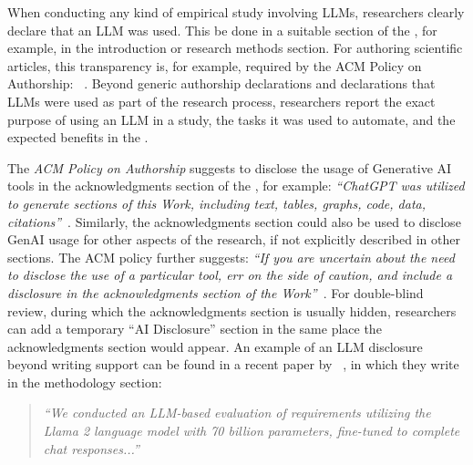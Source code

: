 
When conducting any kind of empirical study involving LLMs, researchers \must clearly declare that an LLM was used.
This \should be done in a suitable section of the \paper, for example, in the introduction or research methods section.
For authoring scientific articles, this transparency is, for example, required by the ACM Policy on Authorship: ~\cite{ACM2023}.
Beyond generic authorship declarations and declarations that LLMs were used as part of the research process, researchers \should report the exact purpose of using an LLM in a study, the tasks it was used to automate, and the expected benefits in the \paper.


The \emph{ACM Policy on Authorship} suggests to disclose the usage of Generative AI tools in the acknowledgments section of the \paper, for example: \emph{``ChatGPT was utilized to generate sections of this Work, including text, tables, graphs, code, data, citations''}~\cite{ACM2023}. 
Similarly, the acknowledgments section could also be used to disclose GenAI usage for other aspects of the research, if not explicitly described in other sections.
The ACM policy further suggests: \emph{``If you are uncertain about the need to disclose the use of a particular tool, err on the side of caution, and include a disclosure in the acknowledgments section of the Work''}~\cite{ACM2023}.
For double-blind review, during which the acknowledgments section is usually hidden, researchers can add a temporary ``AI Disclosure'' section in the same place the acknowledgments section would appear. 
An example of an LLM disclosure beyond writing support can be found in a recent paper by \citeauthor{DBLP:conf/re/LubosFTGMEL24}~\cite{DBLP:conf/re/LubosFTGMEL24}, in which they write in the methodology section:

\begin{quote}
\small
\it
``We conducted an LLM-based evaluation of requirements utilizing the Llama 2 language model with 70 billion parameters, fine-tuned to complete chat responses...''
\end{quote}


